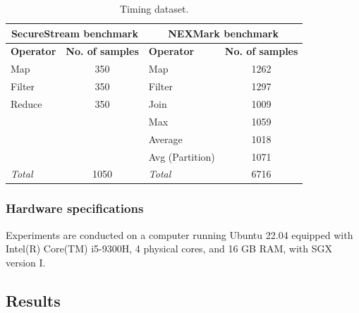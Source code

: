 \begin{table}
\caption{Timing dataset.}
\label{tab:dataset}
\begin{tabular}{lc|lc}
\hline
\multicolumn{2}{c|}{\textbf{SecureStream benchmark}}                            & \multicolumn{2}{c}{\textbf{NEXMark benchmark}}                       \\ \hline
\textbf{Operator}             & \multicolumn{1}{l|}{\textbf{No. of samples}} & \textbf{Operator}   & \multicolumn{1}{l}{\textbf{No. of samples}} \\ \hline
Map                           & 350                                             & Map                 & 1262                                           \\
Filter                        & 350                                             & Filter              & 1297                                           \\
Reduce                        & 350                                             & Join                & 1009                                           \\
\multicolumn{1}{c}{\textbf{}} & \multicolumn{1}{l|}{}                           & Max                 & 1059                                           \\
                              &                                                 & Average   & 1018                                           \\
                              &                                                 & Avg (Partition) & 1071                                           \\ \hline
\textit{Total}                & 1050                                            & \textit{Total}      & 6716                                           \\ \hline
\end{tabular}
\end{table}


\subsubsection*{Hardware specifications}
Experiments are conducted on a computer running Ubuntu 22.04 equipped with Intel(R) Core(TM) i5-9300H, 4 physical cores, and 16 GB RAM, with SGX version I.

\subsection{Results}
\label{subsec:results}

